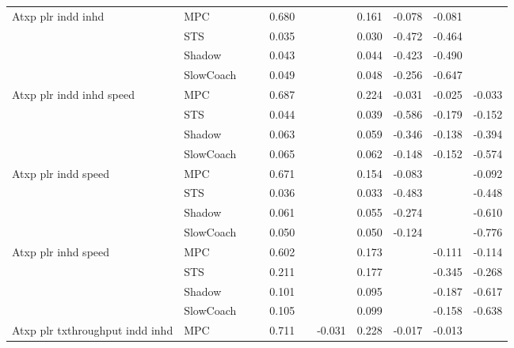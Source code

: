 \begin{tabular}{|l|l|*{9}{c|}}
\midrule
Atxp plr indd inhd    & MPC &       &        &     0.680 &     &     &  0.161 &  -0.078 &  -0.081 &       \\
                              & STS &       &        &     0.035 &     &     &  0.030 &  -0.472 &  -0.464 &       \\
                              & Shadow &       &        &     0.043 &     &     &  0.044 &  -0.423 &  -0.490 &       \\
                              & SlowCoach &       &        &     0.049 &     &     &  0.048 &  -0.256 &  -0.647 &       \\
\midrule
Atxp plr indd inhd speed    & MPC &       &        &     0.687 &     &     &  0.224 &  -0.031 &  -0.025 &   -0.033 \\
                              & STS &       &        &     0.044 &     &     &  0.039 &  -0.586 &  -0.179 &   -0.152 \\
                              & Shadow &       &        &     0.063 &     &     &  0.059 &  -0.346 &  -0.138 &   -0.394 \\
                              & SlowCoach &       &        &     0.065 &     &     &  0.062 &  -0.148 &  -0.152 &   -0.574 \\
\midrule
Atxp plr indd speed    & MPC &       &        &     0.671 &     &     &  0.154 &  -0.083 &      &   -0.092 \\
                              & STS &       &        &     0.036 &     &     &  0.033 &  -0.483 &      &   -0.448 \\
                              & Shadow &       &        &     0.061 &     &     &  0.055 &  -0.274 &      &   -0.610 \\
                              & SlowCoach &       &        &     0.050 &     &     &  0.050 &  -0.124 &      &   -0.776 \\
\midrule
Atxp plr inhd speed    & MPC &       &        &     0.602 &     &     &  0.173 &      &  -0.111 &   -0.114 \\
                              & STS &       &        &     0.211 &     &     &  0.177 &      &  -0.345 &   -0.268 \\
                              & Shadow &       &        &     0.101 &     &     &  0.095 &      &  -0.187 &   -0.617 \\
                              & SlowCoach &       &        &     0.105 &     &     &  0.099 &      &  -0.158 &   -0.638 \\
\midrule
Atxp plr txthroughput indd inhd    & MPC &       &        &     0.711 &     & -0.031 &  0.228 &  -0.017 &  -0.013 &       \\

\end{tabular}
